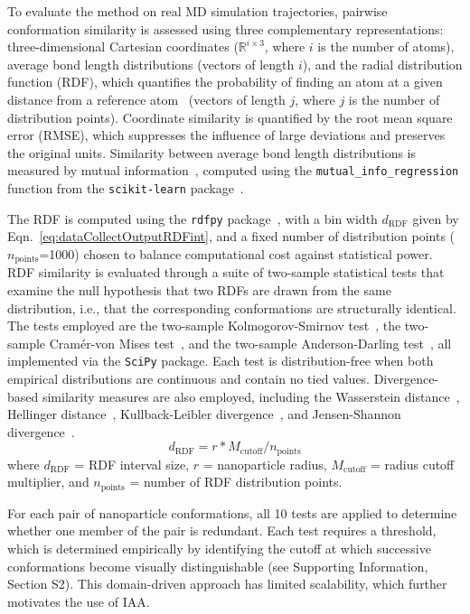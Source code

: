 \documentclass{WileyMSP-template}
\begin{document}
To evaluate the method on real MD simulation trajectories, pairwise conformation similarity is assessed using three complementary representations: three-dimensional Cartesian coordinates ($\mathbb{R}^{i \times 3}$, where $i$ is the number of atoms), average bond length distributions (vectors of length $i$), and the radial distribution function (RDF), which quantifies the probability of finding an atom at a given distance from a reference atom~\cite{Liu2018NPRDF} (vectors of length $j$, where $j$ is the number of distribution points). Coordinate similarity is quantified by the root mean square error (RMSE), which suppresses the influence of large deviations and preserves the original units. Similarity between average bond length distributions is measured by mutual information~\cite{Kinney2014MI}, computed using the \texttt{mutual\_info\_regression} function from the \texttt{scikit-learn} package~\cite{Pedregosa2011sklearn}.

The RDF is computed using the \texttt{rdfpy} package~\cite{Yildirim2021rdfpy}, with a bin width $d_\mathrm{RDF}$ given by Eqn.~\ref{eq:dataCollectOutputRDFint}, and a fixed number of distribution points ($n_\mathrm{points}$=1000) chosen to balance computational cost against statistical power. RDF similarity is evaluated through a suite of two-sample statistical tests that examine the null hypothesis that two RDFs are drawn from the same distribution, i.e., that the corresponding conformations are structurally identical. The tests employed are the two-sample Kolmogorov-Smirnov test~\cite{Conover1965KStest}, the two-sample Cram\'er-von Mises test~\cite{Anderson1962CMtest}, and the two-sample Anderson-Darling test~\cite{Scholz2012ADtest}, all implemented via the \texttt{SciPy} package. Each test is distribution-free when both empirical distributions are continuous and contain no tied values. Divergence-based similarity measures are also employed, including the Wasserstein distance~\cite{Kantorovich1960KantorovichDist}, Hellinger distance~\cite{Beran1977HellingerDist}, Kullback-Leibler divergence~\cite{Kullback1951KLdiv}, and Jensen-Shannon divergence~\cite{Fuglede2004JSdiv}.
\begin{equation} \label{eq:dataCollectOutputRDFint}
d_\mathrm{RDF} = r * M_\mathrm{cutoff} / n_\mathrm{points}
\end{equation}
where $d_\mathrm{RDF}$ = RDF interval size, $r$ = nanoparticle radius, $M_\mathrm{cutoff}$ = radius cutoff multiplier, and $n_\mathrm{points}$ = number of RDF distribution points.

For each pair of nanoparticle conformations, all 10 tests are applied to determine whether one member of the pair is redundant. Each test requires a threshold, which is determined empirically by identifying the cutoff at which successive conformations become visually distinguishable (see Supporting Information, Section S2). This domain-driven approach has limited scalability, which further motivates the use of IAA.
\end{document}
